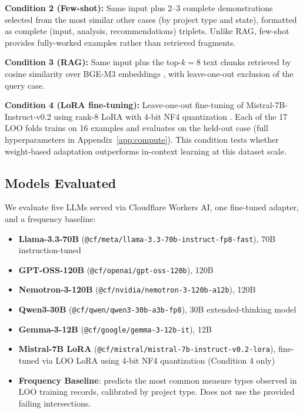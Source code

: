 \documentclass[preprint,12pt]{elsarticle}
\begin{document}
\textbf{Condition 2 (Few-shot):} Same input plus 2--3 complete demonstrations
selected from the most similar other cases (by project type and state),
formatted as complete (input, analysis, recommendations) triplets.
Unlike RAG, few-shot provides fully-worked examples rather than retrieved fragments.

\textbf{Condition 3 (RAG):} Same input plus the top-$k = 8$ text chunks
retrieved by cosine similarity over BGE-M3 embeddings \citep{BGEM3},
with leave-one-out exclusion of the query case.

\textbf{Condition 4 (LoRA fine-tuning):} Leave-one-out fine-tuning of
Mistral-7B-Instruct-v0.2 \citep{jiang2023mistral} using rank-8 LoRA
\citep{hu2022lora} with 4-bit NF4 quantization \citep{dettmers2023qlora}.
Each of the 17 LOO folds trains on 16 examples and evaluates on the
held-out case (full hyperparameters in Appendix~\ref{app:compute}).
This condition tests whether weight-based adaptation outperforms
in-context learning at this dataset scale.

\subsection{Models Evaluated}

We evaluate five LLMs served via Cloudflare Workers AI, one fine-tuned
adapter, and a frequency baseline:

\begin{itemize}
\item \textbf{Llama-3.3-70B} \citep{touvron2023llama2} (\texttt{@cf/meta/llama-3.3-70b-instruct-fp8-fast}), 70B instruction-tuned
\item \textbf{GPT-OSS-120B} \citep{openai2023gpt4} (\texttt{@cf/openai/gpt-oss-120b}), 120B
\item \textbf{Nemotron-3-120B} (\texttt{@cf/nvidia/nemotron-3-120b-a12b}), 120B
\item \textbf{Qwen3-30B} (\texttt{@cf/qwen/qwen3-30b-a3b-fp8}), 30B extended-thinking model
\item \textbf{Gemma-3-12B} \citep{team2024gemma} (\texttt{@cf/google/gemma-3-12b-it}), 12B
\item \textbf{Mistral-7B LoRA} \citep{jiang2023mistral} (\texttt{@cf/mistral/mistral-7b-instruct-v0.2-lora}), fine-tuned via LOO LoRA \citep{hu2022lora} using 4-bit NF4 quantization \citep{dettmers2023qlora} (Condition 4 only)
\item \textbf{Frequency Baseline}: predicts the most common measure types
observed in LOO training records, calibrated by project type.
Does not use the provided failing intersections.
\end{itemize}
\end{document}
